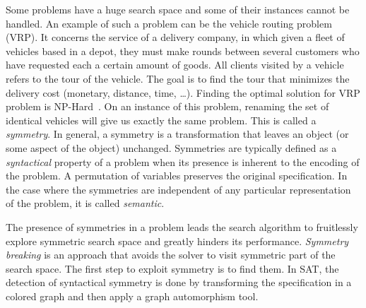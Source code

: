 Some problems have a huge search space and some of their instances cannot be handled.
An example of such a problem can be the vehicle routing problem (VRP).
It concerns the service of a delivery company, in which
given a fleet of vehicles based in a depot, they must make rounds between several customers  who have requested
each a certain amount of goods. All clients visited by a vehicle refers to the tour of the vehicle. 
The goal is to find the tour that minimizes the delivery cost (monetary, distance, time, …).
Finding the optimal solution for VRP problem is NP-Hard~\cite{toth2002vehicle}.
On an instance of this problem, renaming the set of identical vehicles will give us exactly the same problem.
This is called a \textit{symmetry}. In general, a symmetry is a transformation that leaves an object (or some aspect of the object) unchanged. Symmetries are typically defined as a \textit{syntactical} property of a problem when its presence is inherent to the encoding of the problem. A permutation of variables preserves the original specification. In the case where the symmetries are independent of any 
particular representation of the problem, it is called \textit{semantic}.

The presence of symmetries in a problem leads the search algorithm to fruitlessly explore symmetric
search space and greatly hinders its performance. \textit{Symmetry breaking} is an approach that
avoids the solver to visit symmetric part of the search space. The first step to exploit symmetry is to find them.
In SAT, the detection of syntactical symmetry is done by transforming the specification
in a colored graph and then apply a graph automorphism tool.


%
%
%
%
%
%
%
%
%

